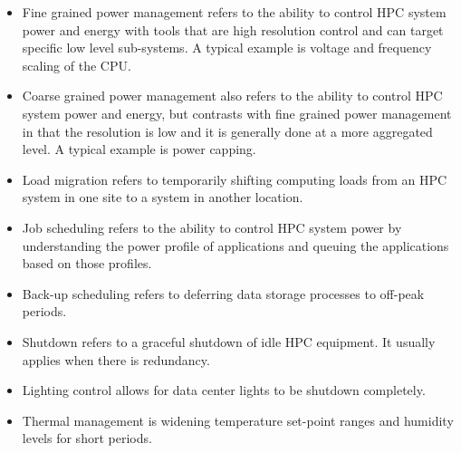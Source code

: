 \begin{itemize}
\item Fine grained power management refers to the ability to control HPC system power 
and energy with tools that are high resolution control and can target specific 
low level sub-systems. A typical example is voltage and frequency scaling of the CPU.

\item Coarse grained power management also refers to the ability to control HPC 
system power and energy, but contrasts with fine grained power management in 
that the resolution is low and it is generally done at a more aggregated level. 
A typical example is power capping.

\item Load migration refers to temporarily shifting computing loads from 
an HPC system in one site to a system in another location.

\item Job scheduling refers to the ability to control HPC system power 
by understanding the power profile of applications and queuing the 
applications based on those profiles.

\item Back-up scheduling refers to deferring data storage processes to off-peak periods.

\item Shutdown refers to a graceful shutdown of idle HPC equipment. It usually 
applies when there is redundancy.

\item Lighting control allows for data center lights to be shutdown completely.

\item Thermal management is widening temperature set-point ranges and 
humidity levels for short periods.
\end{itemize}
